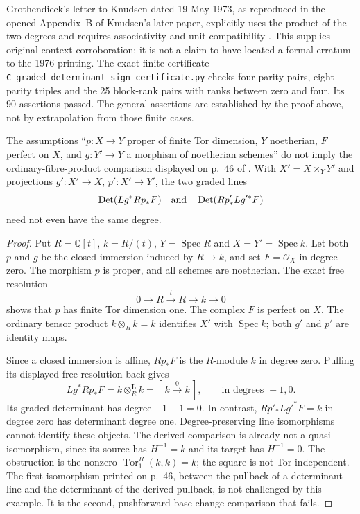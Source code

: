 Grothendieck's letter to Knudsen dated 19 May 1973, as reproduced in
the opened Appendix~B of Knudsen's later paper, explicitly uses the
product of the two degrees and requires associativity and unit
compatibility \cite[Appendix~B, author-version pp.~40--42, especially
p.~41]{A567_GrothendieckKnudsen1973Letter}.
This supplies original-context corroboration; it is not a claim to
have located a formal erratum to the 1976 printing.
The exact finite certificate \texttt{C\_graded\_determinant\_sign\_certificate.py}
checks four parity pairs, eight parity triples and the 25 block-rank
pairs with ranks between zero and four.  Its 90 assertions passed.
The general assertions are established by the proof above, not by
extrapolation from those finite cases.

\begin{proposition}\label{C:determinant-ordinary-basechange}
The assumptions ``$p:X\to Y$ proper of finite Tor dimension,
$Y$ noetherian, $F$ perfect on $X$, and $g:Y'\to Y$ a morphism
of noetherian schemes'' do not imply the ordinary-fibre-product
comparison displayed on p.~46 of
\cite{ROOT_KnudsenMumford1976}.  With
$X'=X\times_Y Y'$ and projections $g':X'\to X$, $p':X'\to Y'$,
the two graded lines
\[
 \operatorname{Det}(Lg^*Rp_*F)
 \quad\hbox{and}\quad
 \operatorname{Det}(Rp'_*Lg'^*F)
\]
need not even have the same degree.
\end{proposition}
\begin{proof}
Put $R=\mathbb Q[t]$, $k=R/(t)$,
$Y=\operatorname{Spec}R$ and
$X=Y'=\operatorname{Spec}k$.  Let both $p$ and $g$ be the closed
immersion induced by $R\to k$, and set $F=\mathcal O_X$ in degree
zero.  The morphism $p$ is proper, and all schemes are noetherian.
The exact free resolution
\[
 0\longrightarrow R\xrightarrow{\ t\ }R\longrightarrow k
   \longrightarrow0
\]
shows that $p$ has finite Tor dimension one.  The complex $F$ is
perfect on $X$.  The ordinary tensor product $k\otimes_R k=k$
identifies $X'$ with $\operatorname{Spec}k$; both $g'$ and $p'$
are identity maps.

Since a closed immersion is affine, $Rp_*F$ is the $R$-module $k$
in degree zero.  Pulling its displayed free resolution back gives
\[
 Lg^*Rp_*F=k\otimes_R^{\mathbf L}k
       = [\,k\xrightarrow{\ 0\ }k\,],
       \qquad\text{in degrees }-1,0.
\]
Its graded determinant has degree $-1+1=0$.  In contrast,
$Rp'_*Lg'^*F=k$ in degree zero has determinant degree one.
Degree-preserving line isomorphisms cannot identify these objects.
The derived comparison is already not a quasi-isomorphism, since
its source has $H^{-1}=k$ and its target has $H^{-1}=0$.
The obstruction is the nonzero
$\operatorname{Tor}_1^R(k,k)=k$; the square is not Tor independent.
The first isomorphism printed on p.~46, between the pullback of a
determinant line and the determinant of the derived pullback, is not
challenged by this example.  It is the second, pushforward base-change
comparison that fails.
\end{proof}

